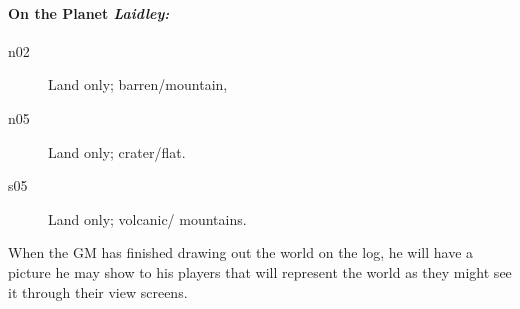 \paragraph{On the Planet \emph{Laidley:}}


\begin{description}
\item[n02] Land only; barren/mountain,
\item[n05] Land only; crater/flat.
\item[s05] Land only; volcanic/ mountains.
\end{description}

When the GM has finished drawing out the world on the log, he will
have a picture he may show to his players that will represent the
world as they might see it through their view screens.



